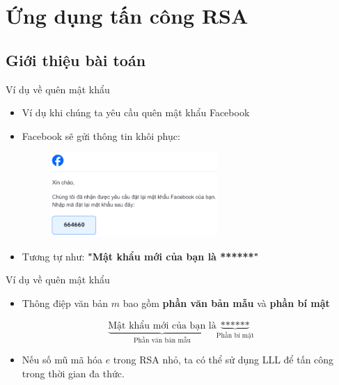 \section{Ứng dụng tấn công RSA}

\subsection{Giới thiệu bài toán}

\begin{frame}{Ví dụ về quên mật khẩu}

\begin{itemize}
\item Ví dụ khi chúng ta yêu cầu quên mật khẩu Facebook
\item Facebook sẽ gửi thông tin khôi phục:

\begin{figure}[h]
\includegraphics[width=0.6\textwidth]{pictures/facebook.png}
\end{figure}

\item Tương tự như: \textbf{"Mật khẩu mới của bạn là ******"}
\end{itemize}

\end{frame}
\begin{frame}{Ví dụ về quên mật khẩu}

\begin{itemize}
\item Thông điệp văn bản \(m \) bao gồm \textbf{phần văn bản mẫu} và \textbf{phần bí mật}
\end{itemize}

$$
\underbrace{\text{Mật khẩu mới của bạn là}}_{\text{Phần văn bản mẫu}}
\underbrace{\text{******}}_{\text{Phần bí mật}}
$$

\begin{itemize}
\item Nếu số mũ mã hóa \(e \) trong RSA nhỏ, ta có thể sử dụng LLL để tấn công trong thời gian đa thức.
\end{itemize}

\end{frame}
